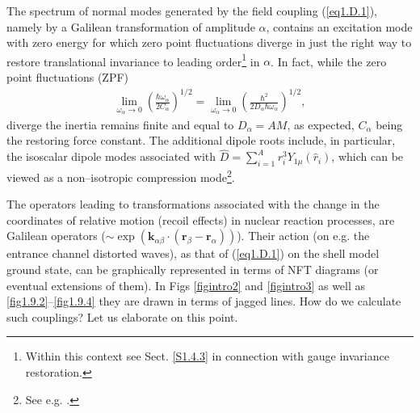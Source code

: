 \begin{subappendices}
The spectrum  of normal modes generated by the field coupling (\ref{eq1.D.1}), namely by a Galilean transformation of amplitude $\alpha$, contains an excitation mode with zero energy for which zero point fluctuations diverge in just the right way to restore translational invariance to leading order\footnote{Within this context see Sect. \ref{S1.4.3} in connection with gauge invariance restoration.} in $\alpha$. In fact, while the zero point fluctuations (ZPF)
\begin{align}\label{eq1.D.4}
\lim_{\omega_\alpha\to 0}\left(\frac{\hbar\omega_\alpha}{2C_\alpha}\right)^{1/2}=\lim_{\omega_\alpha\rightarrow 0}\left(\frac{\hbar^2}{2D_\alpha\hbar\omega_\alpha}\right)^{1/2},
\end{align}
diverge the inertia remains finite and equal to $D_\alpha=AM$, as expected, $C_\alpha$ being the restoring force constant.
The additional dipole roots include, in particular, the isoscalar dipole modes associated with $\hat D=\sum_{i=1}^{A}r^3_iY_{1\mu}(\hat r_i)$, which can be viewed as a non--isotropic compression mode\footnote{See e.g. \cite{Colo:00}.}.

The operators leading to transformations associated with the change in the coordinates of relative motion (recoil effects) in nuclear reaction processes, are Galilean operators ($\sim\exp\left(\mathbf k_{\alpha\beta}\cdot(\mathbf r_\beta-\mathbf{r}_\alpha)\right)$). Their action (on e.g. the entrance channel distorted waves), as that of (\ref{eq1.D.1}) on the shell model ground state, can be graphically represented in terms of NFT diagrams (or eventual extensions of them). In Figs \ref{figintro2} and \ref{figintro3} as well as \ref{fig1.9.2}--\ref{fig1.9.4}  they are drawn in terms of jagged lines. How do we calculate such couplings? Let us elaborate  on this point.



\end{subappendices}
